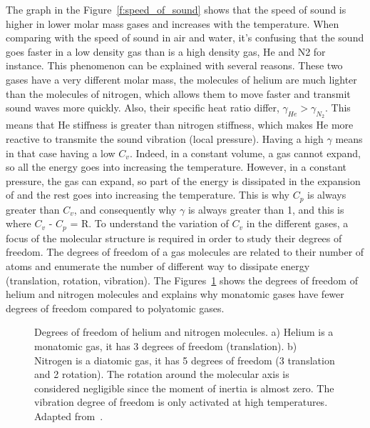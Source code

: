 \documentclass[../main]{subfiles}
\begin{document}
The graph in the Figure~\ref{f:speed_of_sound} shows that the speed of sound is higher in lower molar mass gases and increases with the temperature. When comparing with the speed of sound in air and water, it's confusing that the sound goes faster in a low density gas than is a high density gas, He and N2 for instance. This phenomenon can be explained with several reasons.
These two gases have a very different molar mass, the molecules of helium are much lighter than the molecules of nitrogen, which allows them to move faster and transmit sound waves more quickly.
Also, their specific heat ratio differ, ${\gamma_{He}} > {\gamma_{N_2}}$. This means that He stiffness is greater than nitrogen stiffness, which makes He more reactive to transmite the sound vibration (local pressure). Having a high ${\gamma}$ means in that case having a low ${C_{v}}$. Indeed, in a constant volume, a gas cannot expand, so all the energy goes into increasing the temperature. However, in a constant pressure, the gas can expand, so part of the energy is dissipated in the expansion of and the rest goes into increasing the temperature. This is why ${C_p}$ is always greater than ${C_v}$, and consequently why ${\gamma}$ is always greater than 1, and this is where ${C_{v}}$ - ${C_{p}}$ = R. To understand the variation of ${C_v}$ in the different gases, a focus of the molecular structure is required in order to study their degrees of freedom. The degrees of freedom of a gas molecules are related to their number of atoms and enumerate the number of different way to dissipate energy (translation, rotation, vibration). The Figures~\ref{f:DOF} shows the degrees of freedom of helium and nitrogen molecules and explains why monatomic gases have fewer degrees of freedom compared to polyatomic gases.

\vspace{0mm}
\begin{figure}[H]
    \centering
        
        \caption[Degrees of freedom of helium and nitrogen molecules]{Degrees of freedom of helium and nitrogen molecules. a) Helium is a monatomic gas, it has 3 degrees of freedom (translation). b) Nitrogen is a diatomic gas, it has 5 degrees of freedom (3 translation and 2 rotation). The rotation around the molecular axis is considered negligible since the moment of inertia is almost zero. The vibration degree of freedom is only activated at high temperatures. Adapted from~\cite{More2020DegreeFreedom}.}
        \label{f:DOF}
\end{figure}
\FloatBarrier
\vspace{0mm}
\end{document}
